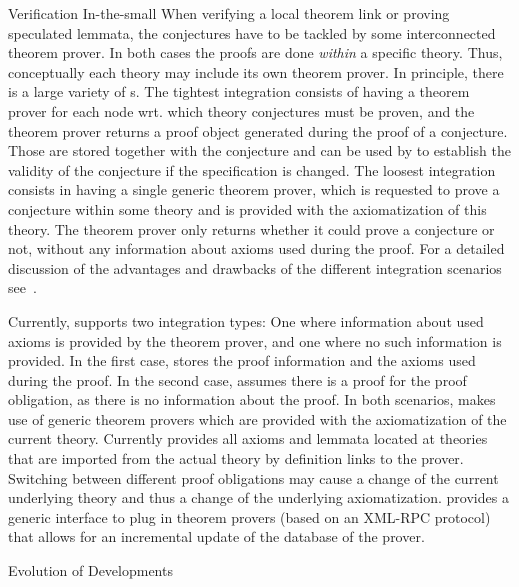 \begin{omgroup}[id=maya,short=Maya,creators={autexier,hutter,mossakowski,shairer}]
\begin{omgroup}{Verification In-the-small}
When verifying a local theorem link or proving speculated lemmata, the conjectures have to
be tackled by some interconnected theorem prover.  In both cases the proofs are done
{\emph{within}} a specific theory.  Thus, conceptually each theory may include its own
theorem prover.  In principle, there is a large variety of
{s}. The tightest integration consists of having a theorem
prover for each node wrt.  which theory conjectures must be proven, and the theorem prover
returns a proof object generated during the proof of a conjecture.  Those are stored
together with the conjecture and can be used by {\maya} to establish the validity of the
conjecture if the specification is changed. The loosest integration consists in having a
single generic theorem prover, which is requested to prove a conjecture within some theory
and is provided with the axiomatization of this theory. The theorem prover only returns
whether it could prove a conjecture or not, without any information about axioms used
during the proof. For a detailed discussion of the advantages and drawbacks of the
different integration scenarios see~\cite{AutMos:ihdgmm02}.

Currently, {\maya} supports two integration types: One where
information about used axioms is provided by the theorem prover, and
one where no such information is provided. In the first case, {\maya}
stores the proof information and the axioms used during the proof. In the second
case, {\maya} assumes there is a proof for the proof obligation, as there is no
information about the proof. In both scenarios, {\maya} makes use of
generic theorem provers which are provided with the axiomatization of
the current theory. Currently {\maya} provides all axioms
and lemmata located at theories that are imported from the actual theory
by definition links to the prover. Switching between different proof obligations may
cause a change of the current underlying theory and thus a change of
the underlying axiomatization.  {\maya} provides a generic interface to
plug in theorem provers (based on an XML-RPC protocol) that allows for
an incremental update of the database of the prover.
\end{omgroup}

\begin{omgroup}{Evolution of Developments}


\end{omgroup}
\end{omgroup}
